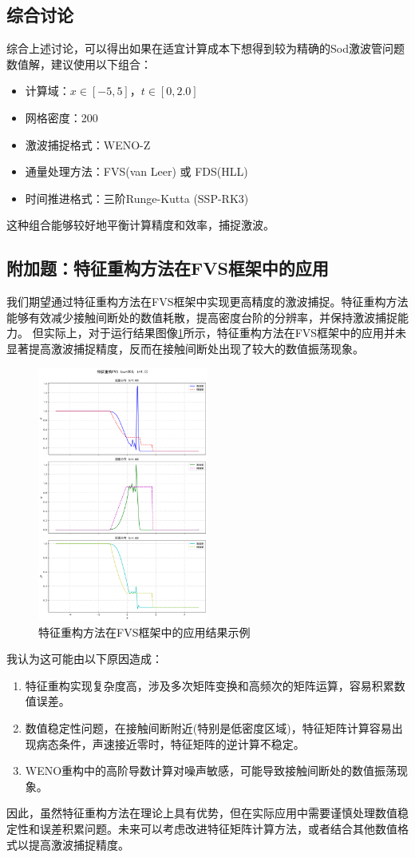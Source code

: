 \documentclass[UTF8]{ctexart}
\begin{document}
\subsection{综合讨论}
综合上述讨论，可以得出如果在适宜计算成本下想得到较为精确的Sod激波管问题数值解，建议使用以下组合：
\begin{itemize}
    \item 计算域：$x \in [-5, 5]$，$t \in [0, 2.0]$
    \item 网格密度：200
    \item 激波捕捉格式：WENO-Z
    \item 通量处理方法：FVS(van Leer) 或 FDS(HLL)
    \item 时间推进格式：三阶Runge-Kutta (SSP-RK3)
\end{itemize}
这种组合能够较好地平衡计算精度和效率，捕捉激波。
\subsection{附加题：特征重构方法在FVS框架中的应用}
我们期望通过特征重构方法在FVS框架中实现更高精度的激波捕捉。特征重构方法能够有效减少接触间断处的数值耗散，提高密度台阶的分辨率，并保持激波捕捉能力。
但实际上，对于运行结果图像\ref{fig:characteristic_effect}所示，特征重构方法在FVS框架中的应用并未显著提高激波捕捉精度，反而在接触间断处出现了较大的数值振荡现象。
\begin{figure}
    \centering
    \includegraphics[width=0.5\textwidth]{characteristic.png}
    \caption{特征重构方法在FVS框架中的应用结果示例}
    \label{fig:characteristic_effect}
\end{figure}
我认为这可能由以下原因造成：
\begin{enumerate}
    \item 特征重构实现复杂度高，涉及多次矩阵变换和高频次的矩阵运算，容易积累数值误差。
    \item 数值稳定性问题，在接触间断附近(特别是低密度区域)，特征矩阵计算容易出现病态条件，声速接近零时，特征矩阵的逆计算不稳定。
    \item WENO重构中的高阶导数计算对噪声敏感，可能导致接触间断处的数值振荡现象。
\end{enumerate}
因此，虽然特征重构方法在理论上具有优势，但在实际应用中需要谨慎处理数值稳定性和误差积累问题。未来可以考虑改进特征矩阵计算方法，或者结合其他数值格式以提高激波捕捉精度。
\end{document}
